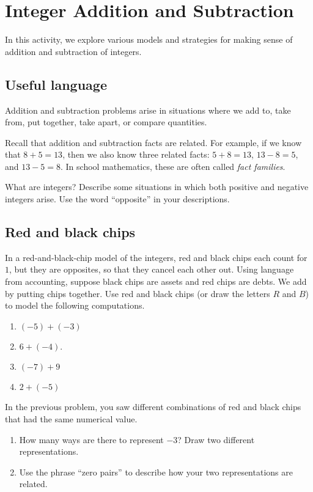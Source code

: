 \newpage
\section{Integer Addition and Subtraction}\label{A:integerAddition}
In this activity, we explore various models and strategies for 
making sense of addition and subtraction of integers.  

\subsection*{Useful language}
Addition and subtraction problems arise in situations where we add to, take from, put together, 
take apart, or compare quantities.  

Recall that addition and subtraction facts are related.  For example, if we know that $8+5 = 13$, 
then we also know three related facts:  $5+8=13$, $13-8=5$, and $13-5=8$.  In school mathematics, 
these are often called \emph{fact families}.  

\begin{prob}
What are integers?  Describe some situations in which both positive and negative integers arise.  Use the word ``opposite'' in your descriptions.  
\end{prob}

\subsection*{Red and black chips}
\begin{prob}
In a red-and-black-chip model of the integers, red and black chips each count for $1$, but they are opposites, so that they cancel each other out.  Using language from accounting, suppose black chips are assets and red chips are debts.  We add by putting chips together.  Use red and black chips (or draw the letters $R$ and $B$) to model the following computations.
\begin{enumerate}
\item $(-5)+(-3)$
\item $6+(-4)$.
\item $(-7)+9$
\item $2+(-5)$
\end{enumerate}
\end{prob}

\begin{prob}
In the previous problem, you saw different combinations of red and black chips that had the same numerical value.  
\begin{enumerate}
\item How many ways are there to represent $-3$?  Draw two different representations. 
\item Use the phrase ``zero pairs'' to describe how your two representations are related.  
\end{enumerate}
\end{prob}

